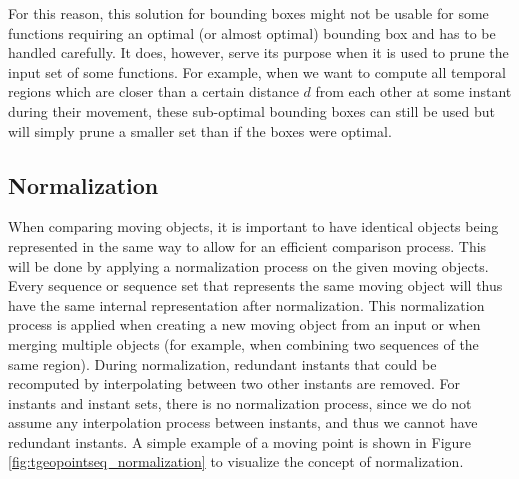 For this reason, this solution for bounding boxes might not be usable for some functions requiring an optimal (or almost optimal) bounding box and has to be handled carefully. It does, however, serve its purpose when it is used to prune the input set of some functions. For example, when we want to compute all temporal regions which are closer than a certain distance $d$ from each other at some instant during their movement, these sub-optimal bounding boxes can still be used but will simply prune a smaller set than if the boxes were optimal.

\subsection{Normalization}
\label{section:normalization}

When comparing moving objects, it is important to have identical objects being represented in the same way to allow for an efficient comparison process. This will be done by applying a normalization process on the given moving objects. Every sequence or sequence set that represents the same moving object will thus have the same internal representation after normalization. This normalization process is applied when creating a new moving object from an input or when merging multiple objects (for example, when combining two sequences of the same region). During normalization, redundant instants that could be recomputed by interpolating between two other instants are removed. For instants and instant sets, there is no normalization process, since we do not assume any interpolation process between instants, and thus we cannot have redundant instants. A simple example of a moving point is shown in Figure \ref{fig:tgeopointseq_normalization} to visualize the concept of normalization.

